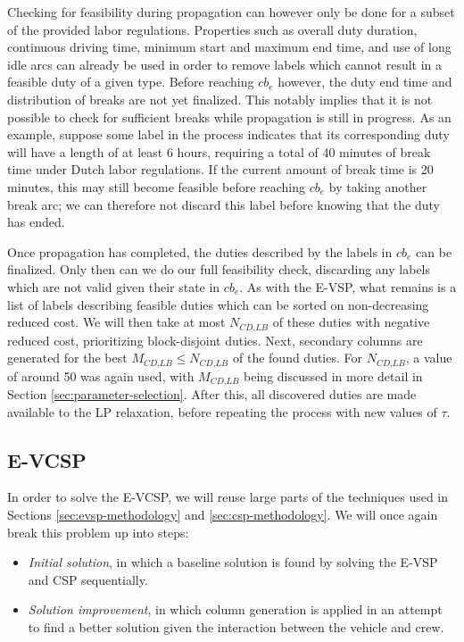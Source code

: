\documentclass[]{article}
\begin{document}
Checking for feasibility during propagation can however only be done for a subset of the provided labor regulations. Properties such as overall duty duration, continuous driving time, minimum start and maximum end time, and use of long idle arcs can already be used in order to remove labels which cannot result in a feasible duty of a given type. Before reaching $cb_e$ however, the duty end time and distribution of breaks are not yet finalized. This notably implies that it is not possible to check for sufficient breaks while propagation is still in progress. As an example, suppose some label in the process indicates that its corresponding duty will have a length of at least 6 hours, requiring a total of 40 minutes of break time under Dutch labor regulations. If the current amount of break time is 20 minutes, this may still become feasible before reaching $cb_e$ by taking another break arc; we can therefore not discard this label before knowing that the duty has ended.  

Once propagation has completed, the duties described by the labels in $cb_e$ can be finalized. Only then can we do our full feasibility check, discarding any labels which are not valid given their state in $cb_e$. As with the E-VSP, what remains is a list of labels describing feasible duties which can be sorted on non-decreasing reduced cost. We will then take at most $N_{\textit{CD,LB}}$ of these duties with negative reduced cost, prioritizing block-disjoint duties. Next, secondary columns are generated for the best $M_{\textit{CD,LB}} \leq N_{\textit{CD,LB}}$ of the found duties. For $N_{\textit{CD,LB}}$, a value of around 50 was again used, with $M_{\textit{CD,LB}}$ being discussed in more detail in Section \ref{sec:parameter-selection}. After this, all discovered duties are made available to the LP relaxation, before repeating the process with new values of $\tau$. 

\subsection{E-VCSP}
In order to solve the E-VCSP, we will reuse large parts of the techniques used in Sections \ref{sec:evsp-methodology} and \ref{sec:csp-methodology}. We will once again break this problem up into steps: 
\begin{itemize}
  \item \textit{Initial solution}, in which a baseline solution is found by solving the E-VSP and CSP sequentially.
  \item \textit{Solution improvement}, in which column generation is applied in an attempt to find a better solution given the interaction between the vehicle and crew.
\end{itemize}
\end{document}
